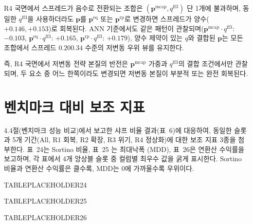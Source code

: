\documentclass{article}
\begin{document}
R4 국면에서 스프레드가 음수로 전환되는 조합은 $(\mathbf{p}^{\mathrm{mcap}}, q^{\mathrm{ff3}})$ 단 1개에 불과하며, 동일한 $q^{\mathrm{ff3}}$을 사용하더라도 $\mathbf{p}$를 $\mathbf{p}^{\mathrm{eq}}$ 또는 $\mathbf{p}^{\mathrm{rp}}$로 변경하면 스프레드가 양수($+0.146, +0.153$)로 회복된다. ANN 기준에서도 같은 패턴이 관찰되며($\mathbf{p}^{\mathrm{mcap}} \cdot q^{\mathrm{ff3}}$: $-0.103$, $\mathbf{p}^{\mathrm{eq}} \cdot q^{\mathrm{ff3}}$: $+0.165$, $\mathbf{p}^{\mathrm{rp}} \cdot q^{\mathrm{ff3}}$: $+0.179$), 양수 제약이 있는 $q$와 결합된 $\mathbf{p}$는 모든 조합에서 스프레드 $0.20$\textendash $0.34$ 수준의 저변동 우위 뷰를 유지한다.

즉, R4 국면에서 저변동 전략 본질의 반전은 $\mathbf{p}^{\mathrm{mcap}}$ 가중과 $q^{\mathrm{ff3}}$의 결합 조건에서만 관찰되며, 두 요소 중 어느 한쪽이라도 변경되면 저변동 본질이 부분적 또는 완전 회복된다.

\section{벤치마크 대비 보조 지표}\label{app:benchmark}

4.4절(벤치마크 성능 비교)에서 보고한 샤프 비율 결과(표~6)에 대응하여, 동일한 슬롯과 5개 기간(All, R1 회복, R2 확장, R3 위기, R4 정상화)에 대한 보조 지표 3종을 첨부한다.  표~24는 Sortino 비율, 표~25 는 최대낙폭 (MDD), 표~26은 연환산 수익률을 보고하며, 각 표에서 4개 앙상블 슬롯 중 컬럼별 최우수 값을 굵게 표시한다. Sortino 비율과 연환산 수익률은 클수록, MDD는 0에 가까울수록 우위이다.



TABLEPLACEHOLDER24





TABLEPLACEHOLDER25





TABLEPLACEHOLDER26
\end{document}
